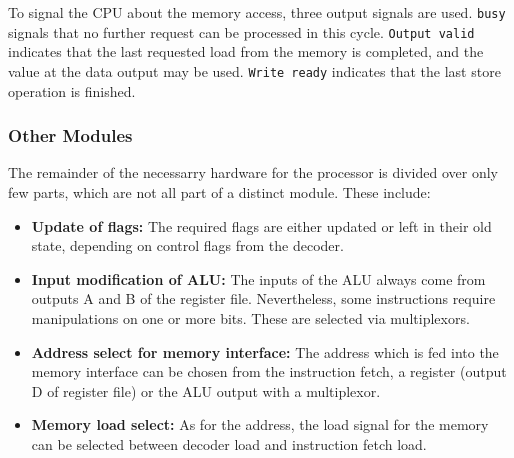To signal the CPU about the memory access, three output signals are used. \texttt{busy} signals that no further request can be processed in this cycle. \texttt{Output valid} indicates that the last requested load from the memory is completed, and the value at the data output may be used. \texttt{Write ready} indicates that the last store operation is finished. 

\subsubsection{Other Modules}
\label{subsubsec:othermodules}

The remainder of the necessarry hardware for the processor is divided over only few parts, which are not all part of a distinct module. These include:
\begin{itemize}
\item \textbf{Update of flags: }The required flags are either updated or left in their old state, depending on control flags from the decoder.
\item \textbf{Input modification of ALU:} The inputs of the ALU always come from outputs A and B of the register file. Nevertheless, some instructions require manipulations on one or more bits. These are selected via multiplexors.
\item \textbf{Address select for memory interface:} The address which is fed into the memory interface can be chosen from the instruction fetch, a register (output D of register file) or the ALU output with a multiplexor.
\item \textbf{Memory load select:} As for the address, the load signal for the memory can be selected between decoder load and instruction fetch load.
\end{itemize}

